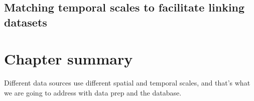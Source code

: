 \subsection{Matching temporal scales to facilitate linking datasets} \label{subsec:matching_temporal_scales}

\section{Chapter summary} \label{sec:data_sources_summary}
Different data sources use different spatial and temporal scales, and that's what we are going to address with data prep and the database.
